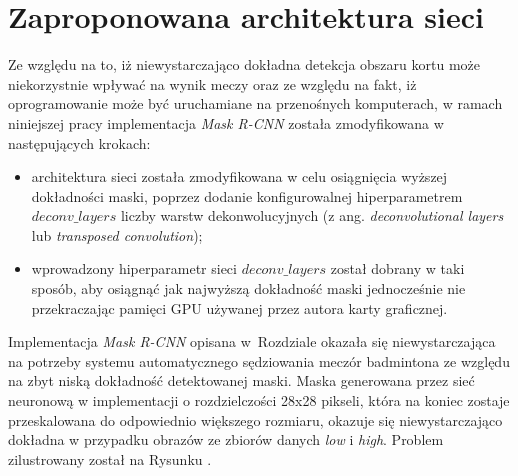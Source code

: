 \newpage
\section{Zaproponowana architektura sieci}
\label{sec:zaproponowana_architektura}

Ze względu na to, iż niewystarczająco dokładna detekcja obszaru kortu może niekorzystnie wpływać na wynik meczy oraz ze względu na fakt, iż oprogramowanie może być uruchamiane na przenośnych komputerach, w ramach niniejszej pracy implementacja \textit{Mask R-CNN} została zmodyfikowana w następujących krokach:

\begin{itemize}
	\item architektura sieci została zmodyfikowana w celu osiągnięcia wyższej dokładności maski, poprzez dodanie konfigurowalnej hiperparametrem $deconv\_layers$ liczby warstw dekonwolucyjnych (z ang. \textit{deconvolutional layers} lub \textit{transposed convolution});
	\item wprowadzony hiperparametr sieci $deconv\_layers$ został dobrany w taki sposób, aby osiągnąć jak najwyższą dokładność maski jednocześnie nie przekraczając pamięci GPU używanej przez autora karty graficznej.
\end{itemize}

Implementacja \textit{Mask R-CNN} opisana w~Rozdziale  okazała się niewystarczająca na potrzeby systemu automatycznego sędziowania meczór badmintona ze względu na zbyt niską dokładność detektowanej maski.
Maska generowana przez sieć neuronową w implementacji \cite{matterport-mask-rcnn} o rozdzielczości 28x28 pikseli, która na koniec zostaje przeskalowana do odpowiednio większego rozmiaru, okazuje się niewystarczająco dokładna w przypadku obrazów ze zbiorów danych \textit{low} i \textit{high}.
Problem zilustrowany został na Rysunku . 

